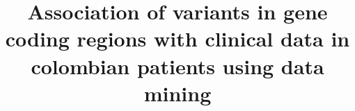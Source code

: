 \documentclass[twocolumn]{bmcart}%
\begin{document}
\begin{frontmatter}

\begin{fmbox}


\title{Association of variants in gene coding regions with clinical data in colombian patients using data mining}


\author[
   addressref={aff1},                   %
   corref={aff1},                       %
   noteref={n1},                        %
   email={jevelezse@unal.edu.co}   %
]{ }
\author[
   addressref={aff2},
   email={eleonguz@unal.edu.co}
]{ }


\address[id=aff1]{%
  , %
  ,                              %
}
\address[id=aff2]{%
  ,
  ,
}


\end{fmbox}
\end{frontmatter}
\end{document}
